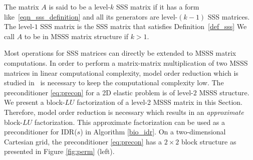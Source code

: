 {\begin{definition}\label{def_msss}
The matrix $A$ is said to be a level-$k$ SSS matrix if it has a form like~\eqref{eqn_sss_definition} and all its 
generators are level-$(k-1)$ SSS matrices. The level-$1$ SSS matrix is the SSS matrix that satisfies Definition~\ref{def_sss} We call $A$ to be in MSSS matrix structure if $k > 1$. 
\end{definition}

Most operations for SSS matrices can directly be extended to MSSS matrix computations. In order to perform a matrix-matrix multiplication
of two MSSS matrices in linear computational complexity, model order reduction which is studied in~\cite{CD05,QG15,QG15a} is necessary to keep 
the computational complexity low. The preconditioner \eqref{eq:precon} for a 2D elastic problem is of level-$2$ MSSS structure. We present a block-$LU$ factorization of a level-2 MSSS matrix in this Section. Therefore, model order reduction is necessary which results in an \textit{approximate} block-$LU$ factorization. This approximate factorization can be used as a preconditioner for IDR($s$) in Algorithm \ref{bio_idr}. On a two-dimensional Cartesian grid, the preconditioner \eqref{eq:precon} has a $2 \times 2$ block structure as presented in Figure \ref{fig:perm} (left).

}
